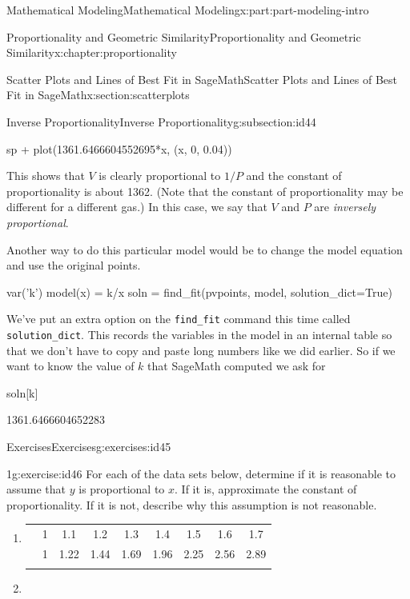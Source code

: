 \documentclass[oneside,10pt,]{book}
\newcommand{\tabularfont}{\relax}
\newcommand{\mono}[1]{\texttt{#1}}
\numberwithin{equation}{section}
\newcommand{\hrulethin}  {\noalign{\hrule height 0.04em}}
\newcommand{\hrulethick} {\noalign{\hrule height 0.11em}}
\begin{document}
\begin{partptx}{Mathematical Modeling}{}{Mathematical Modeling}{}{}{x:part:part-modeling-intro}
\begin{chapterptx}{Proportionality and Geometric Similarity}{}{Proportionality and Geometric Similarity}{}{}{x:chapter:proportionality}
\begin{sectionptx}{Scatter Plots and Lines of Best Fit in SageMath}{}{Scatter Plots and Lines of Best Fit in SageMath}{}{}{x:section:scatterplots}
\begin{subsectionptx}{Inverse Proportionality}{}{Inverse Proportionality}{}{}{g:subsection:id44}
\begin{sageinput}
sp + plot(1361.6466604552695*x, (x, 0, 0.04))
\end{sageinput}
This shows that \(V\) is clearly proportional to \(1/P\) and the constant of proportionality is about 1362.  (Note that the constant of proportionality may be different for a different gas.)  In this case, we say that \(V\) and \(P\) are \emph{inversely proportional}.%
\par
Another way to do this particular model would be to change the model equation and use the original points.%
\begin{sageinput}
var('k')
model(x) = k/x
soln = find_fit(pvpoints, model, solution_dict=True)
\end{sageinput}
We've put an extra option on the \mono{find\_fit} command this time called \mono{solution\_dict}. This records the variables in the model in an internal table so that we don't have to copy and paste long numbers like we did earlier. So if we want to know the value of \(k\) that SageMath computed we ask for%
\begin{sageinput}
soln[k]
\end{sageinput}
\begin{sageoutput}
1361.6466604652283
\end{sageoutput}
\end{subsectionptx}
%
%
\typeout{************************************************}
\typeout{************************************************}
%
\begin{exercises-subsection}{Exercises}{}{Exercises}{}{}{g:exercises:id45}
\begin{divisionexercise}{1}{}{}{g:exercise:id46}%
For each of the data sets below, determine if it is reasonable to assume that \(y\) is proportional to \(x\). If it is, approximate the constant of proportionality. If it is not, describe why this assumption is not reasonable.%
\begin{enumerate}[font=\bfseries,label=(\alph*),ref=\alph*]
\item{}\begin{center}%
{\tabularfont%
\begin{tabular}{ccccccccc}\hrulethick
\multicolumn{1}{cA}{\(x\)}&1&1.1&1.2&1.3&1.4&1.5&1.6&1.7\tabularnewline\hrulethin
\multicolumn{1}{cA}{\(y\)}&1&1.22&1.44&1.69&1.96&2.25&2.56&2.89\tabularnewline\hrulethick
\end{tabular}
}%
\end{center}%
\item{}\begin{center}%

\end{center}
\end{enumerate}
\end{divisionexercise}
\end{exercises-subsection}
\end{sectionptx}
\end{chapterptx}
\end{partptx}
\end{document}

